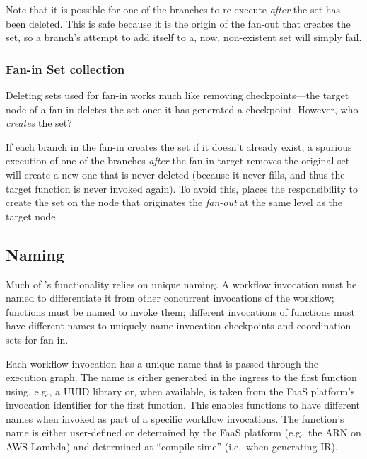 Note that it is possible for one of the branches to re-execute \emph{after}
the set has been deleted. This is safe because it is the origin of the fan-out
that creates the set, so a branch's attempt to add itself to a, now,
non-existent set will simply fail.



\subsubsection{Fan-in Set collection}

Deleting sets used for fan-in works much like removing checkpoints---the
target node of a fan-in deletes the set once it has generated a checkpoint.
However, who \emph{creates} the set?

If each branch in the fan-in creates the set if it doesn't already exist, a
spurious execution of one of the branches \emph{after} the fan-in target
removes the original set will create a new one that is never deleted (because
it never fills, and thus the target function is never invoked again). To avoid
this, \name{} places the responsibility to create the set on the node that
originates the \emph{fan-out} at the same level as the target node.

\subsection{Naming}\label{sec:design:naming}

Much of \name{}'s functionality relies on unique naming. A workflow invocation
must be named to differentiate it from other concurrent invocations of the
workflow; functions must be named to invoke them; different invocations of
functions must have different names to uniquely name invocation checkpoints
and coordination sets for fan-in.

Each workflow invocation has a unique name that is passed through the
execution graph. The name is either generated in the ingress to the first
function using, e.g., a UUID library or, when available, is taken from the
FaaS platform's invocation identifier for the first function. This enables
functions to have different names when invoked as part of a specific workflow
invocations. The function's name is either user-defined or determined by the
FaaS platform (e.g.\ the ARN on AWS Lambda) and determined at ``compile-time''
(i.e.\ when generating \name{} IR).

